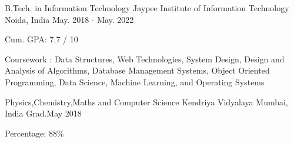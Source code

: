 



\begin{cventries}

  \cventry
    {B.Tech. in Information Technology} %
    {Jaypee Institute of Information Technology} %
    {Noida, India} %
    {May. 2018 - May. 2022} %
    {
      \begin{cvitems} %
        \item {Cum. GPA: 7.7 / 10}
        \item {
        Coursework : Data Structures, Web Technologies, System Design, Design and Analysis of Algorithms, Database Management Systems, Object Oriented Programming, Data Science, Machine Learning, and Operating Systems
        }
      \end{cvitems}
    }
    
    \cventry
    {Physics,Chemistry,Maths and Computer Science} %
    {Kendriya Vidyalaya} %
    {Mumbai, India} %
    {Grad.May 2018} %
    {
      \begin{cvitems} %
        \item {Percentage: 88\%}
      \end{cvitems}
    }
    
    
    
    

    
\end{cventries}

